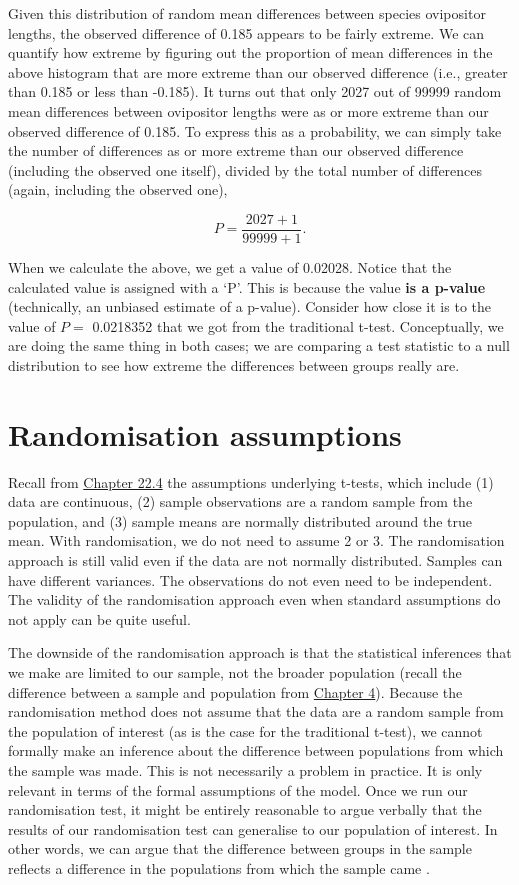 \documentclass[
]{scrbook}
\begin{document}
Given this distribution of random mean differences between species ovipositor lengths, the observed difference of 0.185 appears to be fairly extreme.
We can quantify how extreme by figuring out the proportion of mean differences in the above histogram that are more extreme than our observed difference (i.e., greater than 0.185 or less than -0.185).
It turns out that only 2027 out of 99999 random mean differences between ovipositor lengths were as or more extreme than our observed difference of 0.185.
To express this as a probability, we can simply take the number of differences as or more extreme than our observed difference (including the observed one itself), divided by the total number of differences (again, including the observed one),

\[P = \frac{2027 + 1}{99999 + 1}.\]

When we calculate the above, we get a value of 0.02028.
Notice that the calculated value is assigned with a `P'.
This is because the value \textbf{is a p-value} (technically, an unbiased estimate of a p-value). Consider how close it is to the value of \(P =\) 0.0218352 that we got from the traditional t-test.
Conceptually, we are doing the same thing in both cases; we are comparing a test statistic to a null distribution to see how extreme the differences between groups really are.

\hypertarget{randomisation-assumptions}{%
\section{Randomisation assumptions}\label{randomisation-assumptions}}

Recall from \protect\hyperlink{assumptions-of-t-tests}{Chapter 22.4} the assumptions underlying t-tests, which include (1) data are continuous, (2) sample observations are a random sample from the population, and (3) sample means are normally distributed around the true mean.
With randomisation, we do not need to assume 2 or 3.
The randomisation approach is still valid even if the data are not normally distributed.
Samples can have different variances.
The observations do not even need to be independent.
The validity of the randomisation approach even when standard assumptions do not apply can be quite useful.

The downside of the randomisation approach is that the statistical inferences that we make are limited to our sample, not the broader population (recall the difference between a sample and population from \protect\hyperlink{Chapter_4}{Chapter 4}).
Because the randomisation method does not assume that the data are a random sample from the population of interest (as is the case for the traditional t-test), we cannot formally make an inference about the difference between populations from which the sample was made.
This is not necessarily a problem in practice.
It is only relevant in terms of the formal assumptions of the model.
Once we run our randomisation test, it might be entirely reasonable to argue verbally that the results of our randomisation test can generalise to our population of interest.
In other words, we can argue that the difference between groups in the sample reflects a difference in the populations from which the sample came \citep{Ludbrook1998, Ernst2004}.
\end{document}
